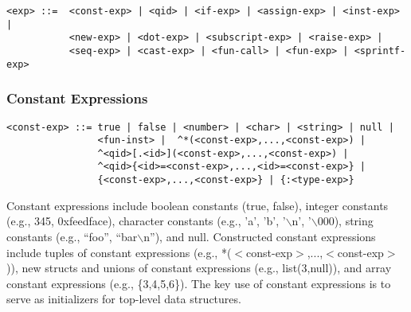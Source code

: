 \documentclass[titlepage,10pt]{article}
\begin{document}

\begin{verbatim}
<exp> ::=  <const-exp> | <qid> | <if-exp> | <assign-exp> | <inst-exp> |
           <new-exp> | <dot-exp> | <subscript-exp> | <raise-exp> | 
           <seq-exp> | <cast-exp> | <fun-call> | <fun-exp> | <sprintf-exp>
\end{verbatim}


\subsubsection{Constant Expressions}


\begin{verbatim}
<const-exp> ::= true | false | <number> | <char> | <string> | null |
                <fun-inst> |  ^*(<const-exp>,...,<const-exp>) | 
                ^<qid>[.<id>](<const-exp>,...,<const-exp>) | 
                ^<qid>{<id>=<const-exp>,...,<id>=<const-exp>} |
                {<const-exp>,...,<const-exp>} | {:<type-exp>} 
\end{verbatim}

Constant expressions include boolean constants (true, false), integer
constants (e.g., 345, 0xfeedface), character constants (e.g., 'a', 'b',
'$\backslash$n', '$\backslash$000), string constants (e.g., ``foo'',
``bar$\backslash$n''), and null.  Constructed constant expressions
include tuples of constant expressions (e.g.,
*($<$const-exp$>$,...,$<$const-exp$>$)), new structs and unions of
constant expressions (e.g., list(3,null)), and array constant
expressions (e.g., \{3,4,5,6\}).   The key use of constant expressions
is to serve as initializers for top-level data structures.
\end{document}
